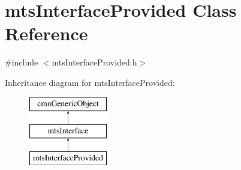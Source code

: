 \hypertarget{classmts_interface_provided}{\section{mts\-Interface\-Provided Class Reference}
\label{classmts_interface_provided}
}


{\ttfamily \#include $<$mts\-Interface\-Provided.\-h$>$}

Inheritance diagram for mts\-Interface\-Provided\-:\begin{figure}[H]
\begin{center}
\leavevmode
\includegraphics[height=3.000000cm]{d9/d9d/classmts_interface_provided}
\end{center}
\end{figure}
